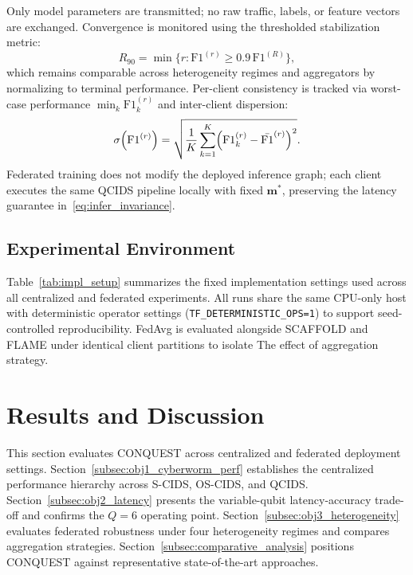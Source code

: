 \documentclass[conference]{IEEEtran}
\begin{document}
Only model parameters are transmitted; no raw traffic, labels,
or feature vectors are exchanged. Convergence is monitored
using the thresholded stabilization metric:
\begin{equation}
R_{90}=\min\bigl\{r:\mathrm{F1}^{(r)}\ge
0.9\,\mathrm{F1}^{(R)}\bigr\},
\label{eq:r90}
\end{equation}
which remains comparable across heterogeneity regimes and
aggregators by normalizing to terminal performance. Per-client
consistency is tracked via worst-case performance
$\min_k\mathrm{F1}_k^{(r)}$ and inter-client dispersion:
\begin{equation}
\sigma\!\left(\mathrm{F1}^{(r)}\right)=
\sqrt{\frac{1}{K}\sum_{k=1}^{K}
\Bigl(\mathrm{F1}_k^{(r)}-\bar{\mathrm{F1}}^{(r)}\Bigr)^2}.
\label{eq:client_var_round}
\end{equation}
Federated training does not modify the deployed inference graph;
each client executes the same QCIDS pipeline locally with
fixed $\mathbf{m}^{*}$, preserving the latency guarantee
in~\eqref{eq:infer_invariance}.

\subsection{Experimental Environment}
\label{subsec:impl_details}
Table~\ref{tab:impl_setup} summarizes the fixed implementation
settings used across all centralized and federated experiments.
All runs share the same CPU-only host with deterministic operator
settings (\texttt{TF\_DETERMINISTIC\_OPS=1}) to support
seed-controlled reproducibility. FedAvg is evaluated alongside
SCAFFOLD and FLAME under identical client partitions to isolate
The effect of aggregation strategy.



\section{\textbf{Results and Discussion}}
\label{sec:results_discussion}

This section evaluates CONQUEST across centralized and federated
deployment settings. Section~\ref{subsec:obj1_cyberworm_perf}
establishes the centralized performance hierarchy across S-CIDS,
OS-CIDS, and QCIDS. Section~\ref{subsec:obj2_latency} presents
the variable-qubit latency-accuracy trade-off and confirms the
$Q{=}6$ operating point. Section~\ref{subsec:obj3_heterogeneity}
evaluates federated robustness under four heterogeneity regimes
and compares aggregation strategies.
Section~\ref{subsec:comparative_analysis} positions CONQUEST
against representative state-of-the-art approaches.
\end{document}
